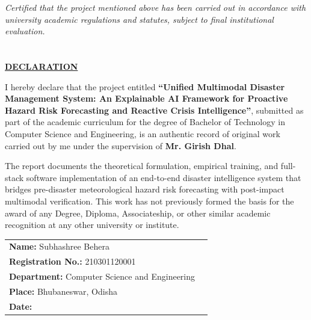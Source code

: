 \documentclass{article}
\begin{document}
\textit{Certified that the project mentioned above has been carried out in accordance with university academic regulations and statutes, subject to final institutional evaluation.}\\[1.2cm]

\begin{table}[H]
\centering
{}
\end{table}

\vfill
\newpage

\section*{}
\begin{center}
\underline{\LARGE \textbf{DECLARATION}}\\[1.2cm]
\end{center}
\large
I hereby declare that the project entitled \textbf{``Unified Multimodal Disaster Management System: An Explainable AI Framework for Proactive Hazard Risk Forecasting and Reactive Crisis Intelligence''}, submitted as part of the academic curriculum for the degree of Bachelor of Technology in Computer Science and Engineering, is an authentic record of original work carried out by me under the supervision of \textbf{Mr. Girish Dhal}. 

The report documents the theoretical formulation, empirical training, and full-stack software implementation of an end-to-end disaster intelligence system that bridges pre-disaster meteorological hazard risk forecasting with post-impact multimodal verification. This work has not previously formed the basis for the award of any Degree, Diploma, Associateship, or other similar academic recognition at any other university or institute.

\vspace{2.5cm}

\begin{tabular}{lr}
\textbf{Name:} Subhashree Behera\\
\textbf{Registration No.:} 210301120001\\
\textbf{Department:} Computer Science and Engineering\\
\textbf{Place:} Bhubaneswar, Odisha\\
\textbf{Date:}
\end{tabular}
\end{document}
